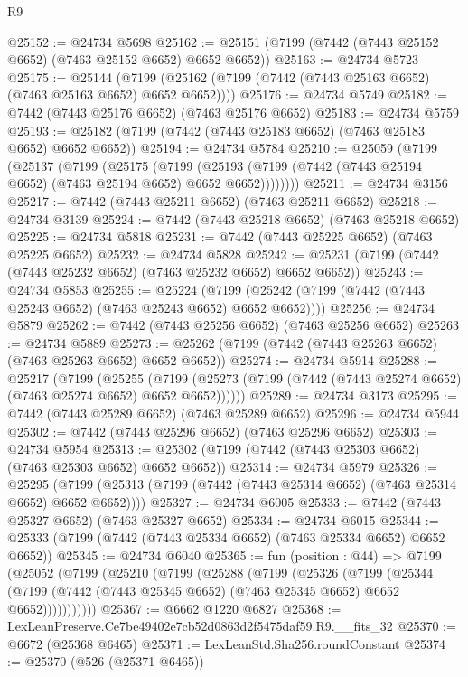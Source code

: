 \begin{lexlean}{R9}
\begin{coremodule}
@25152 := @24734 @5698
@25162 := @25151 (@7199 (@7442 (@7443 @25152 @6652) (@7463 @25152 @6652) @6652 @6652))
@25163 := @24734 @5723
@25175 := @25144
    (@7199 (@25162 (@7199 (@7442 (@7443 @25163 @6652) (@7463 @25163 @6652) @6652 @6652))))
@25176 := @24734 @5749
@25182 := @7442 (@7443 @25176 @6652) (@7463 @25176 @6652)
@25183 := @24734 @5759
@25193 := @25182 (@7199 (@7442 (@7443 @25183 @6652) (@7463 @25183 @6652) @6652 @6652))
@25194 := @24734 @5784
@25210 := @25059
    (@7199
      (@25137
        (@7199
          (@25175
            (@7199
              (@25193 (@7199 (@7442 (@7443 @25194 @6652) (@7463 @25194 @6652) @6652 @6652))))))))
@25211 := @24734 @3156
@25217 := @7442 (@7443 @25211 @6652) (@7463 @25211 @6652)
@25218 := @24734 @3139
@25224 := @7442 (@7443 @25218 @6652) (@7463 @25218 @6652)
@25225 := @24734 @5818
@25231 := @7442 (@7443 @25225 @6652) (@7463 @25225 @6652)
@25232 := @24734 @5828
@25242 := @25231 (@7199 (@7442 (@7443 @25232 @6652) (@7463 @25232 @6652) @6652 @6652))
@25243 := @24734 @5853
@25255 := @25224
    (@7199 (@25242 (@7199 (@7442 (@7443 @25243 @6652) (@7463 @25243 @6652) @6652 @6652))))
@25256 := @24734 @5879
@25262 := @7442 (@7443 @25256 @6652) (@7463 @25256 @6652)
@25263 := @24734 @5889
@25273 := @25262 (@7199 (@7442 (@7443 @25263 @6652) (@7463 @25263 @6652) @6652 @6652))
@25274 := @24734 @5914
@25288 := @25217
    (@7199
      (@25255
        (@7199 (@25273 (@7199 (@7442 (@7443 @25274 @6652) (@7463 @25274 @6652) @6652 @6652))))))
@25289 := @24734 @3173
@25295 := @7442 (@7443 @25289 @6652) (@7463 @25289 @6652)
@25296 := @24734 @5944
@25302 := @7442 (@7443 @25296 @6652) (@7463 @25296 @6652)
@25303 := @24734 @5954
@25313 := @25302 (@7199 (@7442 (@7443 @25303 @6652) (@7463 @25303 @6652) @6652 @6652))
@25314 := @24734 @5979
@25326 := @25295
    (@7199 (@25313 (@7199 (@7442 (@7443 @25314 @6652) (@7463 @25314 @6652) @6652 @6652))))
@25327 := @24734 @6005
@25333 := @7442 (@7443 @25327 @6652) (@7463 @25327 @6652)
@25334 := @24734 @6015
@25344 := @25333 (@7199 (@7442 (@7443 @25334 @6652) (@7463 @25334 @6652) @6652 @6652))
@25345 := @24734 @6040
@25365 := fun (position : @44) =>
  @7199
    (@25052
      (@7199
        (@25210
          (@7199
            (@25288
              (@7199
                (@25326
                  (@7199
                    (@25344
                      (@7199 (@7442 (@7443 @25345 @6652) (@7463 @25345 @6652) @6652 @6652)))))))))))
@25367 := @6662 @1220 @6827
@25368 := LexLeanPreserve.Ce7be49402e7cb52d0863d2f5475daf59.R9.__fits_32
@25370 := @6672 (@25368 @6465)
@25371 := LexLeanStd.Sha256.roundConstant
@25374 := @25370 (@526 (@25371 @6465))

\end{coremodule}
\end{lexlean}
